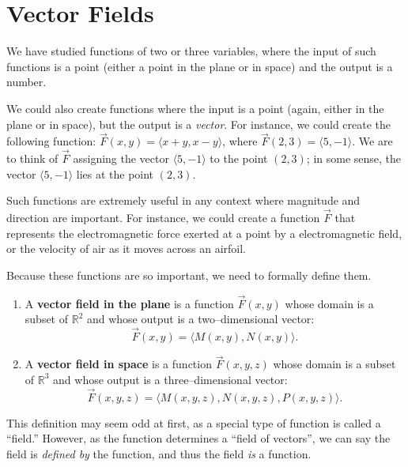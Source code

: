 \section{Vector Fields}\label{sec:vector_fields}

We have studied functions of two or three variables, where the input of such functions is a point (either a point in the plane or in space) and the output is a number.

We could also create functions where the input is a point (again, either in the plane or in space), but the output is a {\em vector}. For instance, we could create the following function: $\vec F(x,y) = \langle x+y, x-y\rangle$, where $\vec F(2,3) = \langle 5,-1\rangle$. We are to think of $\vec F$ assigning the vector $\langle 5,-1\rangle$ to the point $(2,3)$; in some sense, the vector $\langle 5,-1\rangle$ lies at the point $(2,3)$. 

Such functions are extremely useful in any context where magnitude and direction are important. For instance, we could create a function $\vec F$ that represents the electromagnetic force exerted at a point by a electromagnetic field, or the velocity of air as it moves across an airfoil. 

Because these functions are so important, we need to formally define them.

{\begin{enumerate}
	\item A \textbf{vector field in the plane} is a function $\vec F(x,y)$ whose domain is a subset of $\mathbb{R}^2$ and whose output is a two--dimensional vector:
	$$\vec F(x,y) = \langle M(x,y), N(x,y)\rangle.$$
	
	\item A \textbf{vector field in space} is a function $\vec F(x,y,z)$ whose domain is a subset of $\mathbb{R}^3$ and whose output is a three--dimensional vector:
	$$\vec F(x,y,z) = \langle M(x,y,z), N(x,y,z), P(x,y,z)\rangle.$$
\end{enumerate}
}

This definition may seem odd at first, as a special type of function is called a ``field.'' However, as the function determines a ``field of vectors'', we can say the field is \emph{defined by} the function, and thus the field \emph{is} a function.


